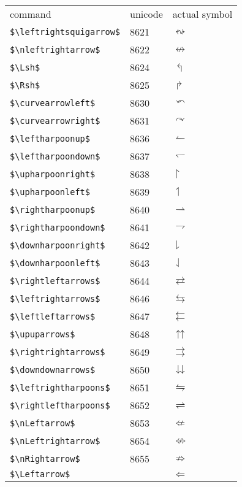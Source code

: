 \documentclass{article}
\begin{document}
\begin{table}
\begin{center}
\begin{tabular}{lll}
command & unicode & actual symbol\\
\verb#$\leftrightsquigarrow$# & 8621 & $\leftrightsquigarrow$\\ 
\verb#$\nleftrightarrow$# & 8622 & $\nleftrightarrow$\\ 
\verb#$\Lsh$# & 8624 & $\Lsh$\\ 
\verb#$\Rsh$# & 8625 & $\Rsh$\\ 
\verb#$\curvearrowleft$# & 8630 & $\curvearrowleft$\\ 
\verb#$\curvearrowright$# & 8631 & $\curvearrowright$\\ 
\verb#$\leftharpoonup$# & 8636 & $\leftharpoonup$\\ 
\verb#$\leftharpoondown$# & 8637 & $\leftharpoondown$\\ 
\verb#$\upharpoonright$# & 8638 & $\upharpoonright$\\ 
\verb#$\upharpoonleft$# & 8639 & $\upharpoonleft$\\ 
\verb#$\rightharpoonup$# & 8640 & $\rightharpoonup$\\ 
\verb#$\rightharpoondown$# & 8641 & $\rightharpoondown$\\ 
\verb#$\downharpoonright$# & 8642 & $\downharpoonright$\\ 
\verb#$\downharpoonleft$# & 8643 & $\downharpoonleft$\\ 
\verb#$\rightleftarrows$# & 8644 & $\rightleftarrows$\\ 
\verb#$\leftrightarrows$# & 8646 & $\leftrightarrows$\\ 
\verb#$\leftleftarrows$# & 8647 & $\leftleftarrows$\\ 
\verb#$\upuparrows$# & 8648 & $\upuparrows$\\ 
\verb#$\rightrightarrows$# & 8649 & $\rightrightarrows$\\ 
\verb#$\downdownarrows$# & 8650 & $\downdownarrows$\\ 
\verb#$\leftrightharpoons$# & 8651 & $\leftrightharpoons$\\ 
\verb#$\rightleftharpoons$# & 8652 & $\rightleftharpoons$\\ 
\verb#$\nLeftarrow$# & 8653 & $\nLeftarrow$\\ 
\verb#$\nLeftrightarrow$# & 8654 & $\nLeftrightarrow$\\ 
\verb#$\nRightarrow$# & 8655 & $\nRightarrow$\\ 
\verb#$\Leftarrow$# &  & $\Leftarrow$\\ 

\end{tabular}
\end{center}
\end{table}
\end{document}
